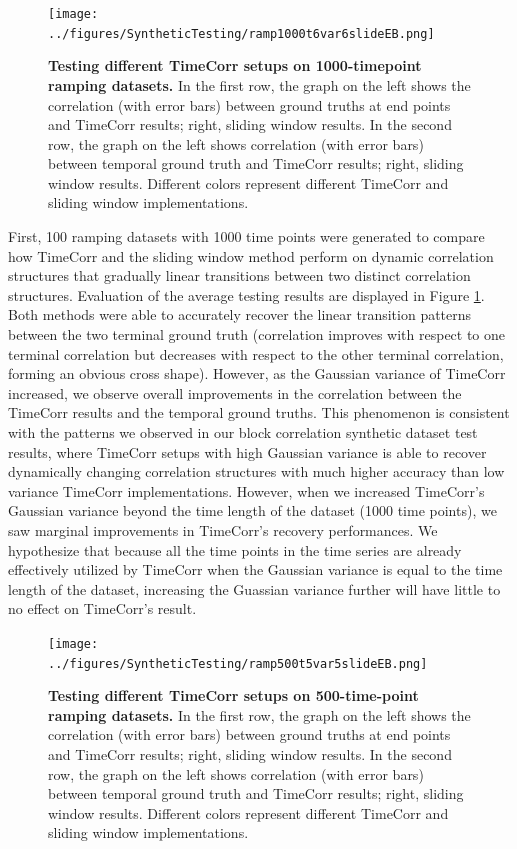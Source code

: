 \documentclass[11pt]{article}
\begin{document}
\begin{figure}[!htb]
\texttt{[image: ../figures/SyntheticTesting/ramp1000t6var6slideEB.png]}
\caption{\textbf{Testing different TimeCorr setups on 1000-timepoint ramping datasets.} In the first row, the graph on the left shows the correlation (with error bars) between ground truths at end points and TimeCorr results; right, sliding window results. In the second row, the graph on the left shows correlation (with error bars) between temporal ground truth and TimeCorr results; right, sliding window results. Different colors represent different TimeCorr and sliding window implementations.}
\label{fig:ramp1000t4var}
\end{figure}

First, 100 ramping datasets with 1000 time points were generated to compare how TimeCorr and the sliding window method perform on dynamic correlation structures that gradually linear transitions between two distinct correlation structures. Evaluation of the average testing results are displayed in Figure \ref{fig:ramp1000t4var}. Both methods were able to accurately recover the linear transition patterns between the two terminal ground truth (correlation improves with respect to one terminal correlation but decreases with respect to the other terminal correlation, forming an obvious cross shape). However, as the Gaussian variance of TimeCorr increased, we observe overall improvements in the correlation between the TimeCorr results and the temporal ground truths. This phenomenon is consistent with the patterns we observed in our block correlation synthetic dataset test results, where TimeCorr setups with high Gaussian variance is able to recover dynamically changing correlation structures with much higher accuracy than low variance TimeCorr implementations. However, when we increased TimeCorr's Gaussian variance beyond the time length of the dataset (1000 time points), we saw marginal improvements in TimeCorr's recovery performances. We hypothesize that because all the time points in the time series are already effectively utilized by TimeCorr when the Gaussian variance is equal to the time length of the dataset, increasing the Guassian variance further will have little to no effect on TimeCorr's result.


\begin{figure}[!htb]
\texttt{[image: ../figures/SyntheticTesting/ramp500t5var5slideEB.png]}
\caption{\textbf{Testing different TimeCorr setups on 500-time-point ramping datasets.} In the first row, the graph on the left shows the correlation (with error bars) between ground truths at end points and TimeCorr results; right, sliding window results. In the second row, the graph on the left shows correlation (with error bars) between temporal ground truth and TimeCorr results; right, sliding window results. Different colors represent different TimeCorr and sliding window implementations.}
\label{fig:ramp500t4var}
\end{figure}
\end{document}
